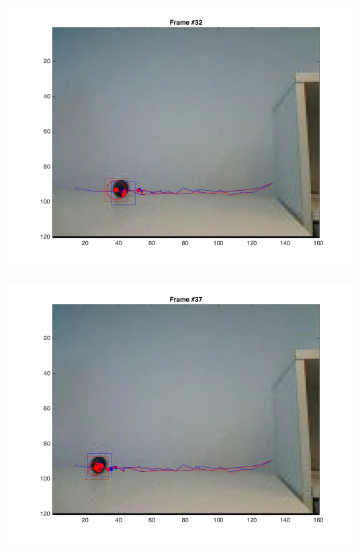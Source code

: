 \documentclass{ethz_report}
\begin{document}
\begin{figure}[h]
\begin{subfigure}[b]{.25\textwidth}
        \includegraphics[width=1\linewidth]{images/video3_bins_low_31}
    \end{subfigure}%
    \begin{subfigure}[b]{.25\textwidth}
        \centering
        \includegraphics[width=1\linewidth]{images/video3_bins_low_36}
    \end{subfigure}
    \begin{subfigure}[b]{.25\textwidth}
        \centering

\end{subfigure}
\end{figure}
\end{document}
